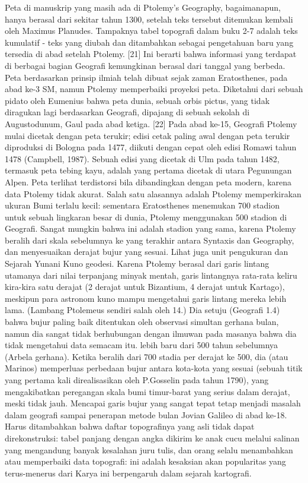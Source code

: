 	Peta di manuskrip yang masih ada di Ptolemy's Geography, bagaimanapun, hanya berasal dari sekitar tahun 1300, setelah teks tersebut ditemukan kembali oleh Maximus Planudes. Tampaknya tabel topografi dalam buku 2-7 adalah teks kumulatif - teks yang diubah dan ditambahkan sebagai pengetahuan baru yang tersedia di abad setelah Ptolemy. [21] Ini berarti bahwa informasi yang terdapat di berbagai bagian Geografi kemungkinan berasal dari tanggal yang berbeda. 
	Peta berdasarkan prinsip ilmiah telah dibuat sejak zaman Eratosthenes, pada abad ke-3 SM, namun Ptolemy memperbaiki proyeksi peta. Diketahui dari sebuah pidato oleh Eumenius bahwa peta dunia, sebuah orbis pictus, yang tidak diragukan lagi berdasarkan Geografi, dipajang di sebuah sekolah di Augustodunum, Gaul pada abad ketiga. [22] Pada abad ke-15, Geografi Ptolemy mulai dicetak dengan peta terukir; edisi cetak paling awal dengan peta terukir diproduksi di Bologna pada 1477, diikuti dengan cepat oleh edisi Romawi tahun 1478 (Campbell, 1987). Sebuah edisi yang dicetak di Ulm pada tahun 1482, termasuk peta tebing kayu, adalah yang pertama dicetak di utara Pegunungan Alpen. Peta terlihat terdistorsi bila dibandingkan dengan peta modern, karena data Ptolemy tidak akurat. Salah satu alasannya adalah Ptolemy memperkirakan ukuran Bumi terlalu kecil: sementara Eratosthenes menemukan 700 stadion untuk sebuah lingkaran besar di dunia, Ptolemy menggunakan 500 stadion di Geografi. Sangat mungkin bahwa ini adalah stadion yang sama, karena Ptolemy beralih dari skala sebelumnya ke yang terakhir antara Syntaxis dan Geography, dan menyesuaikan derajat bujur yang sesuai. Lihat juga unit pengukuran dan Sejarah Yunani Kuno geodesi.
	Karena Ptolemy berasal dari garis lintang utamanya dari nilai terpanjang minyak mentah, garis lintangnya rata-rata keliru kira-kira satu derajat (2 derajat untuk Bizantium, 4 derajat untuk Kartago), meskipun para astronom kuno mampu mengetahui garis lintang mereka lebih lama. (Lambang Ptolemeus sendiri salah oleh 14.) Dia setuju (Geografi 1.4) bahwa bujur paling baik ditentukan oleh observasi simultan gerhana bulan, namun dia sangat tidak berhubungan dengan ilmuwan pada masanya bahwa dia tidak mengetahui data semacam itu. lebih baru dari 500 tahun sebelumnya (Arbela gerhana). Ketika beralih dari 700 stadia per derajat ke 500, dia (atau Marinos) memperluas perbedaan bujur antara kota-kota yang sesuai (sebuah titik yang pertama kali direalisasikan oleh P.Gosselin pada tahun 1790), yang mengakibatkan peregangan skala bumi timur-barat yang serius dalam derajat, meski tidak jauh. Mencapai garis bujur yang sangat tepat tetap menjadi masalah dalam geografi sampai penerapan metode bulan Jovian Galileo di abad ke-18. Harus ditambahkan bahwa daftar topografinya yang asli tidak dapat direkonstruksi: tabel panjang dengan angka dikirim ke anak cucu melalui salinan yang mengandung banyak kesalahan juru tulis, dan orang selalu menambahkan atau memperbaiki data topografi: ini adalah kesaksian akan popularitas yang terus-menerus dari Karya ini berpengaruh dalam sejarah kartografi.


